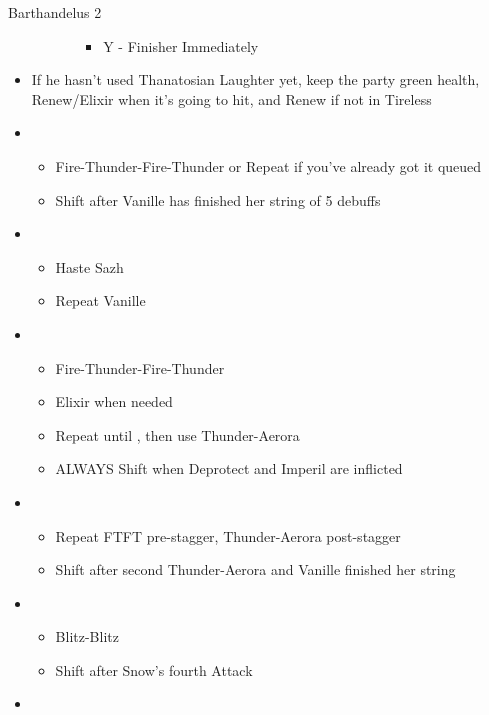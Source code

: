 \begin{battle}[2:30 $|$ 2:15]{Barthandelus 2}
\begin{multicols}{2}
\begin{itemize}
\begin{itemize}
\begin{itemize}
\begin{itemize}
						                  \item Y - Finisher Immediately
					                  \end{itemize}
				            \end{itemize}
			      \end{itemize}
			      \columnbreak
			\item If he hasn't used Thanatosian Laughter yet, keep the party green health, Renew/Elixir when it's going to hit, and Renew if not in Tireless
			\item \fifth
			      \begin{itemize}
				      \item Fire-Thunder-Fire-Thunder or Repeat if you've already got it queued
				      \item Shift after Vanille has finished her string of 5 debuffs
			      \end{itemize}
			\item \first
			      \begin{itemize}
				      \item Haste Sazh
				      \item Repeat Vanille
			      \end{itemize}
			\item \fifth
			      \begin{itemize}
				      \item Fire-Thunder-Fire-Thunder
				      \item Elixir when needed
				      \item Repeat until \stagger, then use Thunder-Aerora
				      \item ALWAYS Shift when Deprotect and Imperil are inflicted
			      \end{itemize}
			\item \second
			      \begin{itemize}
				      \item Repeat FTFT pre-stagger, Thunder-Aerora post-stagger
				      \item Shift after second Thunder-Aerora and Vanille finished her string
			      \end{itemize}
			\item \fourth
			      \begin{itemize}
				      \item Blitz-Blitz
				      \item Shift after Snow's fourth Attack
			      \end{itemize}
			\item \sixth

\end{itemize}
\end{multicols}
\end{battle}
